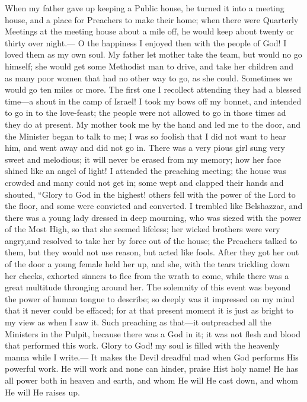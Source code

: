 When my father gave up keeping a Public house, he turned it into a meeting house, and a place for Preachers to make their home; when there were Quarterly Meetings at the meeting house about a mile off, he would keep about twenty or thirty over night.---%
O the happiness I enjoyed then with the people of God!
I loved them as my own soul.
My father let mother take the team, but would no go himself; she would get some Methodist man to drive, and take her children and as many poor women that had no other way to go, as she could.
Sometimes we would go ten miles or more.
The first one I recollect attending they had a blessed time---a shout in the camp of Israel!
I took my bows off my bonnet, and intended to go in to the love-feast; the people were not allowed to go in those times ad they do at present.
My mother took me by the hand and led me to the door, and the Minister began to talk to me; I was so foolish that I did not want to hear him, and went away and did not go in.
There was a very pious girl sung very sweet and melodious; it will never be erased from my memory; how her face shined like an angel of light!
I attended the preaching meeting; the house was crowded and many could not get in; some wept and clapped their hands and shouted, ``Glory to God in the  highest! others fell with the power of the Lord to the floor, and some were convicted and converted.
I trembled like Belshazzar, and there was a young lady dressed in deep mourning, who was siezed with the power of the Most High, so that she seemed lifeless; her wicked brothers were very angry,and resolved to take her by force out of the house; the Preachers talked to them, but they would not use reason, but acted like fools.
After they got her out of the door a young female held her up, and she, with the tears trickling down her cheeks, exhorted sinners to flee from the wrath to come,%
\markpage%
while there was a great multitude thronging around her.
The solemnity of this event was beyond the power of human tongue to describe; so deeply was it impressed on my mind that it never could be effaced; for at that present moment it is just as bright to my view as when I saw it.
Such preaching as that---it outpreached all the Ministers in the Pulpit, because there was a God in it; it was not flesh and blood that performed this work.
Glory to God! my soul is filled with the heavenly manna while I write.---%
It makes the Devil dreadful mad when God performs His powerful work.
He will work and none can hinder, praise Hist holy name!
He has all power both in heaven and earth, and whom He will He cast down, and whom He will He raises up.

